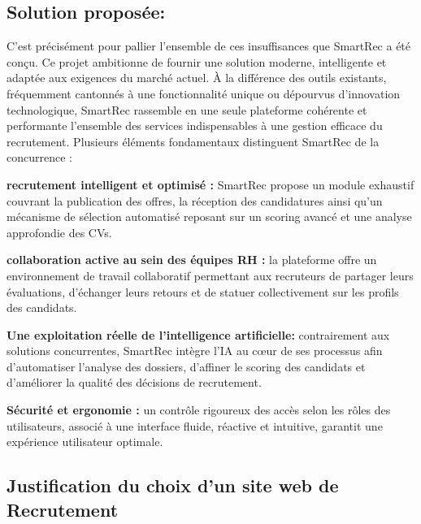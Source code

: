 \subsection{Solution proposée:}
C’est précisément pour pallier l’ensemble de ces insuffisances que SmartRec a été
conçu. Ce projet ambitionne de fournir une solution moderne, intelligente et adaptée aux
exigences du marché actuel. À la différence des outils existants, fréquemment cantonnés à
une fonctionnalité unique ou dépourvus d’innovation technologique, SmartRec rassemble
en une seule plateforme cohérente et performante l’ensemble des services indispensables à
une gestion efficace du recrutement. Plusieurs éléments fondamentaux distinguent SmartRec de la concurrence :

\textbullet \hspace{0.2cm} \textbf {recrutement intelligent et optimisé : } SmartRec propose un module exhaustif couvrant la publication des offres, la réception des candidatures ainsi qu'un mécanisme de sélection automatisé reposant sur un scoring avancé et une analyse approfondie des CVs.

\textbullet \hspace{0.2cm} \textbf{ collaboration active au sein des équipes RH : } la plateforme offre un environnement de travail collaboratif permettant aux recruteurs de partager leurs évaluations, d'échanger leurs retours et de statuer collectivement sur les profils des candidats.



\textbullet \hspace{0.2cm} \textbf{Une exploitation réelle de l'intelligence artificielle:} contrairement aux solutions concurrentes, SmartRec intègre l'IA au cœur de ses processus afin d'automatiser l'analyse des dossiers, d'affiner le scoring des candidats et d'améliorer la qualité des décisions de recrutement.

\textbullet \hspace{0.2cm} \textbf{Sécurité et ergonomie : } un contrôle rigoureux des accès selon les rôles des utilisateurs, associé à une interface fluide, réactive et intuitive, garantit une expérience utilisateur optimale.



\subsection{Justification du choix d’un site web de Recrutement}


